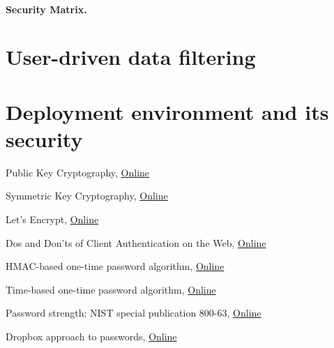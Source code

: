 \documentclass[a4paper,12pt,oneside,openright]{memoir}
\begin{document}
\paragraph{Security Matrix.}

\section*{User-driven data filtering}

\section*{Deployment environment and its security}\label{sec:04}

%
%
\begin{thebibliography}{5}

 Public Key Cryptography,
\href{http://en.wikipedia.org/wiki/Public-key_cryptography}{Online}

 Symmetric Key Cryptography,
\href{http://en.wikipedia.org/wiki/Symmetric-key_algorithm}{Online}

 Let's Encrypt,
\href{https://letsencrypt.org}{Online}

 Dos and Don'ts of Client Authentication on the Web,
\href{https://pdos.csail.mit.edu/papers/webauth:sec10.pdf}{Online}

 HMAC-based one-time password algorithm,
\href{https://en.wikipedia.org/wiki/HMAC-based_One-time_Password_algorithm}{Online}

 Time-based one-time password algorithm,
\href{https://en.wikipedia.org/wiki/Time-based_One-time_Password_algorithm}{Online}

 Password strength: NIST special publication 800-63,
\href{http://en.wikipedia.org/wiki/Password_strength#NIST_Special_Publication_800-63}{Online}

 Dropbox approach to passwords,
\href{https://blogs.dropbox.com/tech/2012/04/zxcvbn-realistic-password-strength-estimation}{Online}


\end{thebibliography}
%
\end{document}
